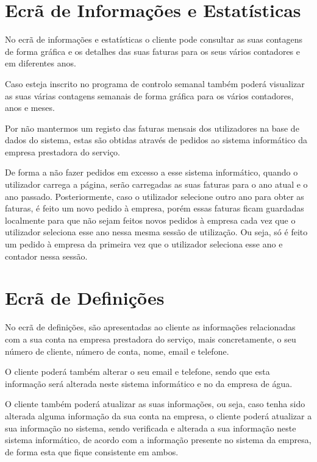 \section{Ecrã de Informações e Estatísticas} \label{ecra:info} %
No ecrã de informações e estatísticas o cliente pode consultar as suas contagens de forma gráfica e os detalhes das suas faturas para os seus vários contadores e em diferentes anos.\par
Caso esteja inscrito no programa de controlo semanal também poderá visualizar as suas várias contagens semanais de forma gráfica para os vários contadores, anos e meses.\par
Por não mantermos um registo das faturas mensais dos utilizadores na base de dados do sistema, estas são obtidas através de pedidos ao sistema informático da empresa prestadora do serviço.\par
De forma a não fazer pedidos em excesso a esse sistema informático, quando o utilizador carrega a página, serão carregadas as suas faturas para o ano atual e o ano passado. Posteriormente, caso o utilizador selecione outro ano para obter as faturas, é feito um novo pedido à empresa, porém essas faturas ficam guardadas localmente para que não sejam feitos novos pedidos à empresa cada vez que o utilizador seleciona esse ano nessa mesma sessão de utilização. Ou seja, só é feito um pedido à empresa da primeira vez que o utilizador seleciona esse ano e contador nessa sessão.\par

\section{Ecrã de Definições} \label{ecra:def} %
No ecrã de definições, são apresentadas ao cliente as informações relacionadas com a sua conta na empresa prestadora do serviço, mais concretamente, o seu número de cliente, número de conta, nome, email e telefone.\par
O cliente poderá também alterar o seu email e telefone, sendo que esta informação será alterada neste sistema informático e no da empresa de água.\par
O cliente também poderá atualizar as suas informações, ou seja, caso tenha sido alterada alguma informação da sua conta na empresa, o cliente poderá atualizar a sua informação no sistema, sendo verificada e alterada a sua informação neste sistema informático, de acordo com a informação presente no sistema da empresa, de forma esta que fique consistente em ambos.

